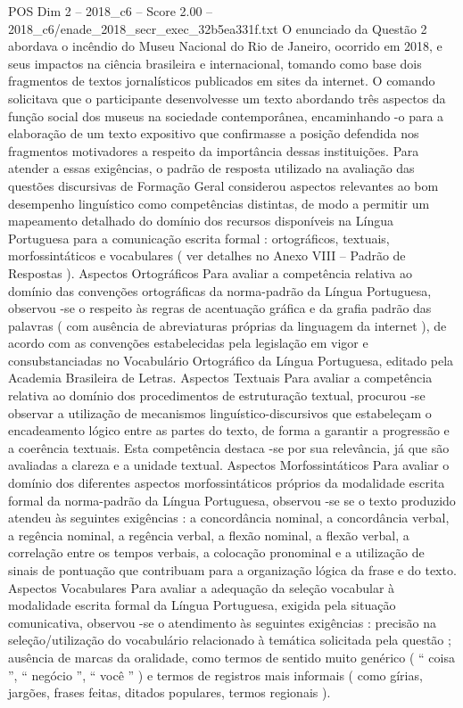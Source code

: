 \begin{textsample}{POS Dim 2 – 2018\_c6 – Score 2.00 – 2018\_c6/enade\_2018\_secr\_exec\_32b5ea331f.txt}
O enunciado da Questão 2 abordava o incêndio do Museu Nacional do Rio de Janeiro, ocorrido em 2018, e seus impactos na ciência brasileira e internacional, tomando como base dois fragmentos de textos jornalísticos publicados em sites da internet.
O comando solicitava que o participante desenvolvesse um texto abordando três aspectos da função social dos museus na sociedade contemporânea, encaminhando -o para a elaboração de um texto expositivo que confirmasse a posição defendida nos fragmentos motivadores a respeito da importância dessas instituições.
Para atender a essas exigências, o padrão de resposta utilizado na avaliação das questões discursivas de Formação Geral considerou aspectos relevantes ao bom desempenho linguístico como competências distintas, de modo a permitir um mapeamento detalhado do domínio dos recursos disponíveis na Língua Portuguesa para a comunicação escrita formal : ortográficos, textuais, morfossintáticos e vocabulares ( ver detalhes no Anexo VIII – Padrão de Respostas ).
Aspectos Ortográficos Para avaliar a competência relativa ao domínio das convenções ortográficas da norma-padrão da Língua Portuguesa, observou -se o respeito às regras de acentuação gráfica e da grafia padrão das palavras ( com ausência de abreviaturas próprias da linguagem da internet ), de acordo com as convenções estabelecidas pela legislação em vigor e consubstanciadas no Vocabulário Ortográfico da Língua Portuguesa, editado pela Academia Brasileira de Letras.
Aspectos Textuais Para avaliar a competência relativa ao domínio dos procedimentos de estruturação textual, procurou -se observar a utilização de mecanismos linguístico-discursivos que estabeleçam o encadeamento lógico entre as partes do texto, de forma a garantir a progressão e a coerência textuais.
Esta competência destaca -se por sua relevância, já que são avaliadas a clareza e a unidade textual.
Aspectos Morfossintáticos Para avaliar o domínio dos diferentes aspectos morfossintáticos próprios da modalidade escrita formal da norma-padrão da Língua Portuguesa, observou -se se o texto produzido atendeu às seguintes exigências : a concordância nominal, a concordância verbal, a regência nominal, a regência verbal, a flexão nominal, a flexão verbal, a correlação entre os tempos verbais, a colocação pronominal e a utilização de sinais de pontuação que contribuam para a organização lógica da frase e do texto.
Aspectos Vocabulares Para avaliar a adequação da seleção vocabular à modalidade escrita formal da Língua Portuguesa, exigida pela situação comunicativa, observou -se o atendimento às seguintes exigências : precisão na seleção/utilização do vocabulário relacionado à temática solicitada pela questão ; ausência de marcas da oralidade, como termos de sentido muito genérico ( “ coisa ”, “ negócio ”, “ você ” ) e termos de registros mais informais ( como gírias, jargões, frases feitas, ditados populares, termos regionais ).

\end{textsample}
